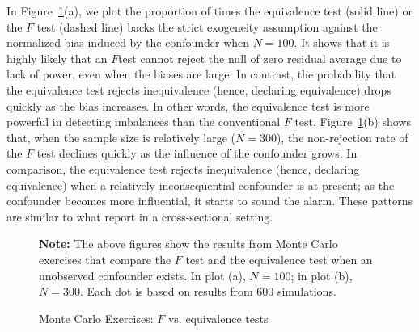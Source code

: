 \documentclass[12pt]{article}
\let\oldcenter\center
\let\oldendcenter\endcenter
\renewenvironment{center}{\setlength\topsep{0pt}\oldcenter}{\oldendcenter}
\begin{document}
In Figure~\ref{fg:sim.tests}(a), we plot the proportion of times the equivalence test (solid line) or the $F$ test (dashed line) backs the strict exogeneity assumption against the normalized bias induced by the confounder when $N = 100$. It shows that it is highly likely that an $F $test cannot reject the null of zero residual average due to lack of power, even when the biases are large. In contrast, the probability that the equivalence test rejects inequivalence (hence, declaring equivalence) drops quickly as the bias increases. In other words, the equivalence test is more powerful in detecting imbalances than the conventional $F$ test. Figure~\ref{fg:sim.tests}(b) shows that, when the sample size is relatively large ($N = 300$), the non-rejection rate of the $F$ test declines quickly as the influence of the confounder grows. In comparison, the equivalence test rejects inequivalence (hence, declaring equivalence) when a relatively inconsequential confounder is at present; as the confounder becomes more influential, it starts to sound the alarm. These patterns are similar to what \citet{hartman2018equivalence} report in a cross-sectional setting. 
\clearpage

\begin{figure}[!ht]
\caption{Monte Carlo Exercises: $F$ vs. equivalence tests}\label{fg:sim.tests}
\begin{center}
\hspace{-1em}
\hspace{0.5em}
\hspace{0.5em}
\end{center}
\footnotesize\textbf{Note:} The above figures show the results from Monte Carlo exercises that compare the $F$ test and the equivalence test when an unobserved confounder exists. In plot (a), $N = 100$; in plot (b), $N = 300$. Each dot is based on results from 600 simulations. 
\end{figure}
\end{document}
